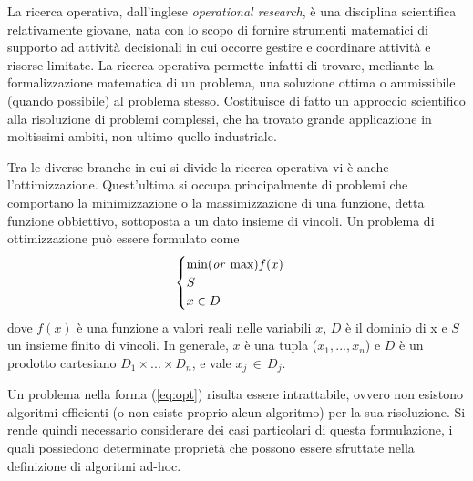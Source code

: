 La ricerca operativa, dall'inglese \textit{operational research}, è una disciplina scientifica relativamente 
giovane, nata con lo scopo di fornire strumenti matematici di supporto ad attività decisionali in cui occorre gestire e coordinare 
attività e risorse limitate. La ricerca operativa permette infatti di trovare, mediante la formalizzazione 
matematica di un problema, una soluzione ottima o ammissibile (quando possibile) al problema stesso. 
Costituisce di fatto un approccio scientifico alla risoluzione di problemi 
complessi, che ha trovato grande applicazione in moltissimi ambiti, non ultimo quello industriale. 

Tra le diverse branche in cui si divide la ricerca operativa vi è anche l'ottimizzazione. 
Quest'ultima si occupa principalmente di problemi che comportano la minimizzazione o la massimizzazione di una funzione, detta funzione
obbiettivo, sottoposta a un dato insieme di vincoli. 
Un problema di ottimizzazione può essere formulato come 
\begin{equation}
	\label{eq:opt}
	\begin{cases}
      \text{min(\textit{or} max)}f(x)\\
      S	\\
      x \in D
    \end{cases}
\end{equation}
dove $f(x)$ è una funzione a valori reali nelle variabili $x$, $D$ è il dominio di x e $S$ un insieme finito di vincoli. In generale,  
$x$ è una tupla ($x_1,...,x_n$) e $D$ è un prodotto cartesiano $D_1 \times ... \times D_n$, e vale $x_j \, \in \, D_j$. 

Un problema nella forma (\ref{eq:opt}) risulta essere intrattabile, ovvero non esistono algoritmi efficienti (o non esiste proprio
alcun algoritmo) per la sua risoluzione. Si rende quindi necessario considerare dei casi particolari di questa formulazione, i quali 
possiedono determinate proprietà che possono essere sfruttate nella definizione di algoritmi ad-hoc.
